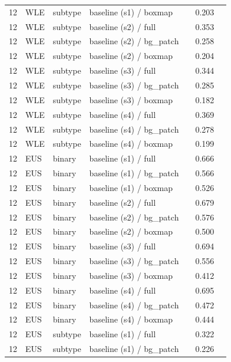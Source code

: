 \begin{longtable}{cL{1.1cm}L{1.5cm}L{5.6cm}ccc}
12 & WLE & subtype & baseline (s1) / boxmap & \nl{} & 0.203 & \nl{} \\
12 & WLE & subtype & baseline (s2) / full & \nl{} & 0.353 & \nl{} \\
12 & WLE & subtype & baseline (s2) / bg\_patch & \nl{} & 0.258 & \nl{} \\
12 & WLE & subtype & baseline (s2) / boxmap & \nl{} & 0.204 & \nl{} \\
12 & WLE & subtype & baseline (s3) / full & \nl{} & 0.344 & \nl{} \\
12 & WLE & subtype & baseline (s3) / bg\_patch & \nl{} & 0.285 & \nl{} \\
12 & WLE & subtype & baseline (s3) / boxmap & \nl{} & 0.182 & \nl{} \\
12 & WLE & subtype & baseline (s4) / full & \nl{} & 0.369 & \nl{} \\
12 & WLE & subtype & baseline (s4) / bg\_patch & \nl{} & 0.278 & \nl{} \\
12 & WLE & subtype & baseline (s4) / boxmap & \nl{} & 0.199 & \nl{} \\
12 & EUS & binary & baseline (s1) / full & \nl{} & 0.666 & \nl{} \\
12 & EUS & binary & baseline (s1) / bg\_patch & \nl{} & 0.566 & \nl{} \\
12 & EUS & binary & baseline (s1) / boxmap & \nl{} & 0.526 & \nl{} \\
12 & EUS & binary & baseline (s2) / full & \nl{} & 0.679 & \nl{} \\
12 & EUS & binary & baseline (s2) / bg\_patch & \nl{} & 0.576 & \nl{} \\
12 & EUS & binary & baseline (s2) / boxmap & \nl{} & 0.500 & \nl{} \\
12 & EUS & binary & baseline (s3) / full & \nl{} & 0.694 & \nl{} \\
12 & EUS & binary & baseline (s3) / bg\_patch & \nl{} & 0.556 & \nl{} \\
12 & EUS & binary & baseline (s3) / boxmap & \nl{} & 0.412 & \nl{} \\
12 & EUS & binary & baseline (s4) / full & \nl{} & 0.695 & \nl{} \\
12 & EUS & binary & baseline (s4) / bg\_patch & \nl{} & 0.472 & \nl{} \\
12 & EUS & binary & baseline (s4) / boxmap & \nl{} & 0.444 & \nl{} \\
12 & EUS & subtype & baseline (s1) / full & \nl{} & 0.322 & \nl{} \\
12 & EUS & subtype & baseline (s1) / bg\_patch & \nl{} & 0.226 & \nl{} \\

\end{longtable}

